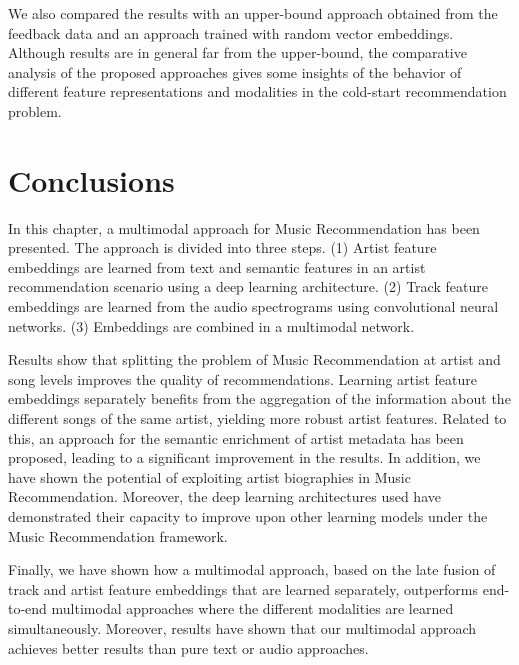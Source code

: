 We also compared the results with an upper-bound approach obtained from the feedback data and an approach trained with random vector embeddings. Although results are in general far from the upper-bound, the comparative analysis of the proposed approaches gives some insights of the behavior of different feature representations and modalities in the cold-start recommendation problem.



\section{Conclusions}
\label{sec:cold-rec:conclusions}

In this chapter, a multimodal approach for Music Recommendation has been presented. The approach is divided into three steps. (1) Artist feature embeddings are learned from text and semantic features in an artist recommendation scenario using a deep learning architecture. (2) Track feature embeddings are learned from the audio spectrograms using convolutional neural networks. (3) Embeddings are combined in a multimodal network.

Results show that splitting the problem of Music Recommendation at artist and song levels improves the quality of recommendations. 
Learning artist feature embeddings separately benefits from the aggregation of the information about the different songs of the same artist, yielding more robust artist features. 
Related to this, an approach for the semantic enrichment of artist metadata has been proposed, leading to a significant improvement in the results. 
In addition, we have shown the potential of exploiting artist biographies in Music Recommendation. 
Moreover, the deep learning architectures used have demonstrated their capacity to improve upon other learning models under the Music Recommendation framework. 

Finally, we have shown how a multimodal approach, based on the late fusion of track and artist feature embeddings that are learned separately, outperforms end-to-end multimodal approaches where the different modalities are learned simultaneously. Moreover, results have shown that our multimodal approach achieves better results than pure text or audio approaches. 
